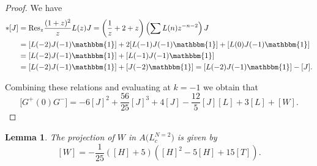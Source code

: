 \documentclass[pdftex]{sigma}
\numberwithin{equation}{section}
\newtheorem{Lemma}[Theorem]{Lemma}
\begin{document}
\begin{proof}
We have
\begin{align*}
		[L]*[J] &= \text{Res}_z \frac{(1+z)^2}{z}L(z)J
		 = \left(\frac{1}{z} + 2 + z\right)\left(\sum L(n)z^{-n-2}\right)J \\
		&= [L(-2)J(-1)\mathbbm{1}] + 2[L(-1)J(-1)\mathbbm{1}] + [L(0)J(-1)\mathbbm{1}] \\
		&= [L(-2)J(-1)\mathbbm{1}] +[L(-1)J(-1)\mathbbm{1}] \\
		&= [L(-2)J(-1)\mathbbm{1}] +[J(-2)\mathbbm{1}] = [L(-2)J(-1)\mathbbm{1}] -[J].
\end{align*}

	
	Combining these relations and evaluating at $k=-1$ we obtain that
\[
 \bigl[G^+(0)G^-\bigr]= -6 [J]^2 + \frac{56}{25}[J]^3 + 4[J] - \frac{12}{5}[J] [L] + 3[L] + [W].\tag*{\qed}
 \] \renewcommand{\qed}{}
	\end{proof}
	
	
	
 \begin{Lemma} The projection of $W$ in $A\bigl(L_c^{N=2}\bigr)$ is given by
\[
[W] = -\frac{1}{25} ([H]+5) \left([H]^2-5 [H]+15[T]\right).
\]

 \end{Lemma}
\end{document}
